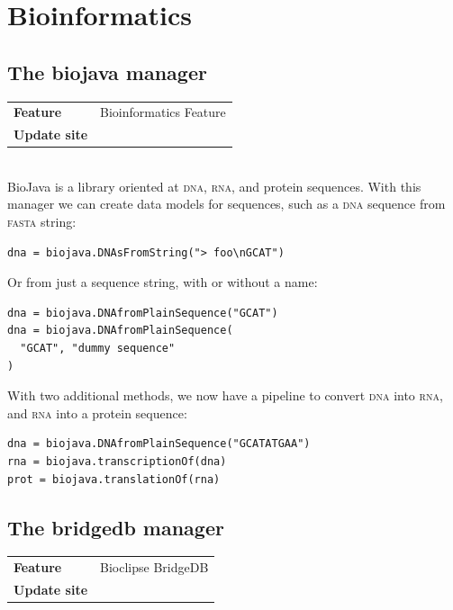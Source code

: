 \documentclass[a5paper, 10pt]{memoir}
\begin{document}
\chapter{Bioinformatics}
\begin{refsection}

\section{The biojava manager}

\begin{tabular}{ll}
\textbf{Feature} & Bioinformatics Feature \\
\textbf{Update site} & \url{} \\
\end{tabular}\\

\noindent
BioJava is a library oriented at \textsc{dna}, \textsc{rna}, and protein
sequences\cite{holland2008biojava,prlic2012biojava}. With this
manager we can create data models for sequences, such as a \textsc{dna}
sequence from \textsc{fasta} string:

\begin{Verbatim}
dna = biojava.DNAsFromString("> foo\nGCAT")
\end{Verbatim}
Or from just a sequence string, with or without a
name:

\begin{Verbatim}
dna = biojava.DNAfromPlainSequence("GCAT")
dna = biojava.DNAfromPlainSequence(
  "GCAT", "dummy sequence"
)
\end{Verbatim}
With two additional methods, we now have a pipeline to convert
\textsc{dna} into \textsc{rna}, and \textsc{rna} into a
protein sequence:

\begin{Verbatim}
dna = biojava.DNAfromPlainSequence("GCATATGAA")
rna = biojava.transcriptionOf(dna)
prot = biojava.translationOf(rna)
\end{Verbatim}

\section{The bridgedb manager}

\begin{tabular}{ll}
\textbf{Feature} & Bioclipse BridgeDB \\
\textbf{Update site} & \url{} \\
\end{tabular} \\


\end{refsection}
\end{document}
